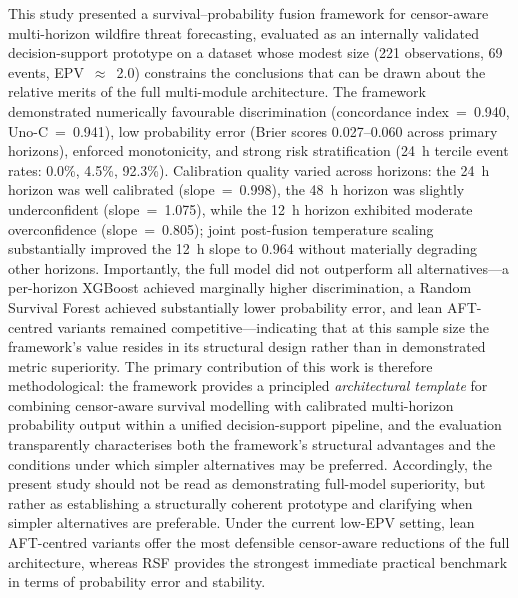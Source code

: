 \documentclass[fire,article,submit,pdftex]{../Definitions/mdpi}
\begin{document}
This study presented a survival--probability fusion framework for censor-aware multi-horizon wildfire threat forecasting, evaluated as an internally validated decision-support prototype on a dataset whose modest size (221 observations, 69 events, EPV~$\approx$~2.0) constrains the conclusions that can be drawn about the relative merits of the full multi-module architecture.
The framework demonstrated numerically favourable discrimination (concordance index~=~0.940, Uno-C~=~0.941), low probability error (Brier scores 0.027--0.060 across primary horizons), enforced monotonicity, and strong risk stratification (24~h tercile event rates: 0.0\%, 4.5\%, 92.3\%).
Calibration quality varied across horizons: the 24~h horizon was well calibrated (slope~=~0.998), the 48~h horizon was slightly underconfident (slope~=~1.075), while the 12~h horizon exhibited moderate overconfidence (slope~=~0.805); joint post-fusion temperature scaling substantially improved the 12~h slope to 0.964 without materially degrading other horizons.
Importantly, the full model did not outperform all alternatives---a per-horizon XGBoost achieved marginally higher discrimination, a Random Survival Forest achieved substantially lower probability error, and lean AFT-centred variants remained competitive---indicating that at this sample size the framework's value resides in its structural design rather than in demonstrated metric superiority.
The primary contribution of this work is therefore methodological: the framework provides a principled \emph{architectural template} for combining censor-aware survival modelling with calibrated multi-horizon probability output within a unified decision-support pipeline, and the evaluation transparently characterises both the framework's structural advantages and the conditions under which simpler alternatives may be preferred.
Accordingly, the present study should not be read as demonstrating full-model superiority, but rather as establishing a structurally coherent prototype and clarifying when simpler alternatives are preferable.
Under the current low-EPV setting, lean AFT-centred variants offer the most defensible censor-aware reductions of the full architecture, whereas RSF provides the strongest immediate practical benchmark in terms of probability error and stability.
\end{document}
